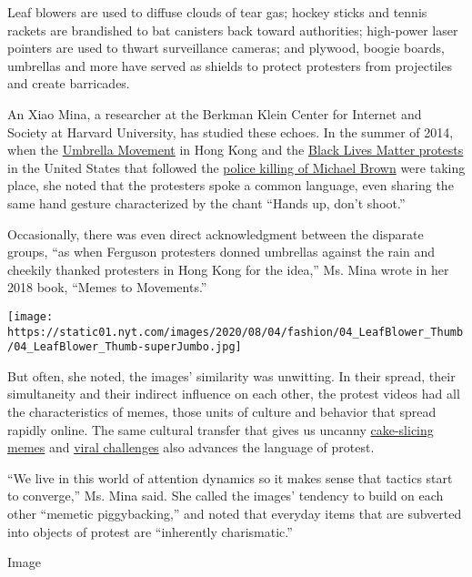 Leaf blowers are used to diffuse clouds of tear gas; hockey sticks and
tennis rackets are brandished to bat canisters back toward authorities;
high-power laser pointers are used to thwart surveillance cameras; and
plywood, boogie boards, umbrellas and more have served as shields to
protect protesters from projectiles and create barricades.

An Xiao Mina, a researcher at the Berkman Klein Center for Internet and
Society at Harvard University, has studied these echoes. In the summer
of 2014, when the
\href{https://www.nytimes.com/2019/08/30/world/asia/hong-kong-protests.html}{Umbrella
Movement} in Hong Kong and the
\href{https://www.nytimes.com/2016/08/23/us/how-blacklivesmatter-came-to-define-a-movement.html}{Black
Lives Matter protests} in the United States that followed the
\href{https://www.nytimes.com/interactive/2014/08/13/us/ferguson-missouri-town-under-siege-after-police-shooting.html}{police
killing of Michael Brown} were taking place, she noted that the
protesters spoke a common language, even sharing the same hand gesture
characterized by the chant ``Hands up, don't shoot.''

Occasionally, there was even direct acknowledgment between the disparate
groups, ``as when Ferguson protesters donned umbrellas against the rain
and cheekily thanked protesters in Hong Kong for the idea,'' Ms. Mina
wrote in her 2018 book, ``Memes to Movements.''

\texttt{[image: https://static01.nyt.com/images/2020/08/04/fashion/04\_LeafBlower\_Thumb/04\_LeafBlower\_Thumb-superJumbo.jpg]}

But often, she noted, the images' similarity was unwitting. In their
spread, their simultaneity and their indirect influence on each other,
the protest videos had all the characteristics of memes, those units of
culture and behavior that spread rapidly online. The same cultural
transfer that gives us uncanny
\href{https://www.nytimes.com/2020/07/14/style/what-is-the-cake-meme.html}{cake-slicing
memes} and
\href{https://www.nytimes.com/2018/08/23/style/shiggy-challenges-inmyfeelings.html}{viral
challenges} also advances the language of protest.

``We live in this world of attention dynamics so it makes sense that
tactics start to converge,'' Ms. Mina said. She called the images'
tendency to build on each other ``memetic piggybacking,'' and noted that
everyday items that are subverted into objects of protest are
``inherently charismatic.''

Image

